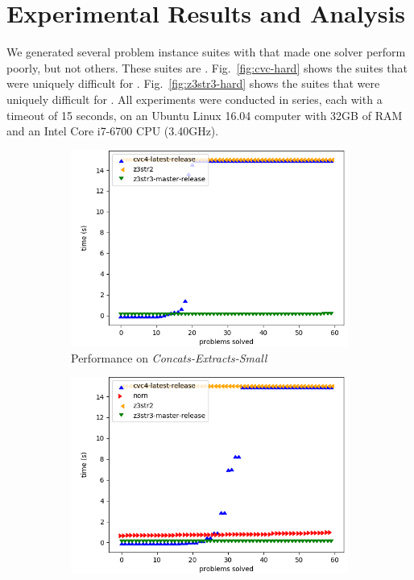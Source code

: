 \section{Experimental Results and Analysis}
\label{sec:data}

We generated several problem instance suites with \fuzzer{} that made one
solver perform poorly, but not others. These suites are
\theSuites{}. Fig.~\ref{fig:cvc-hard} shows the suites that were
uniquely difficult for \cvc{}. Fig.~\ref{fig:z3str3-hard} shows the
suites that were uniquely difficult for \us{}. All experiments were
conducted in series, each with a timeout of 15 seconds,
on an Ubuntu Linux 16.04 computer with 32GB of RAM and an
Intel\textregistered{} Core\texttrademark{} i7-6700 CPU (3.40GHz).
\begin{figure}[h]
    \begin{subfigure}{.5\textwidth}
        \includegraphics[width=\textwidth]{data/graphs/concats-extracts-small.png}
        \caption{Performance on \textit{Concats-Extracts-Small}}
        \label{fig:concats-extracts-small}
    \end{subfigure}
    \begin{subfigure}{.5\textwidth}
        \includegraphics[width=\textwidth]{data/graphs/different-prefix.png}

\end{subfigure}
\end{figure}
